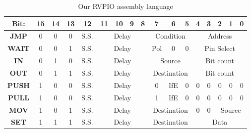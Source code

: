\begin{table}[h!]
    \begin{tabular}{|c|c|c|c|c|c|c|c|c|c|c|c|c|c|c|c|c|}
        \hline
        \textbf{Bit:} & 15 & 14 & 13 & 12   & 11                         & 10                               & 9                              & 8 & 7                               & 6 & 5 & 4 & 3 & 2 & 1 & 0 \\ \hline
        \textbf{JMP}  & 0  & 0  & 0  & S.S. & \multicolumn{4}{c|}{Delay} & \multicolumn{3}{c|}{Condition}   & \multicolumn{5}{c|}{Address}                                                                     \\ \hline
        \textbf{WAIT} & 0  & 0  & 1  & S.S. & \multicolumn{4}{c|}{Delay} & Pol                              & 0                              & 0 & \multicolumn{5}{c|}{Pin Select}                             \\ \hline
        \textbf{IN}   & 0  & 1  & 0  & S.S. & \multicolumn{4}{c|}{Delay} & \multicolumn{3}{c|}{Source}      & \multicolumn{5}{c|}{Bit count}                                                                   \\ \hline
        \textbf{OUT}  & 0  & 1  & 1  & S.S. & \multicolumn{4}{c|}{Delay} & \multicolumn{3}{c|}{Destination} & \multicolumn{5}{c|}{Bit count}                                                                   \\ \hline
        \textbf{PUSH} & 1  & 0  & 0  & S.S. & \multicolumn{4}{c|}{Delay} & 0                                & IfE                            & 0 & 0                               & 0 & 0 & 0 & 0             \\ \hline
        \textbf{PULL} & 1  & 0  & 0  & S.S. & \multicolumn{4}{c|}{Delay} & 1                                & IfE                            & 0 & 0                               & 0 & 0 & 0 & 0             \\ \hline
        \textbf{MOV}  & 1  & 0  & 1  & S.S. & \multicolumn{4}{c|}{Delay} & \multicolumn{3}{c|}{Destination} & 0                              & 0 & \multicolumn{3}{c|}{Source}                                 \\ \hline
        \textbf{SET}  & 1  & 1  & 1  & S.S. & \multicolumn{4}{c|}{Delay} & \multicolumn{3}{c|}{Destination} & \multicolumn{5}{c|}{Data}                                                                        \\ \hline
    \end{tabular}
    \caption{Our RVPIO assembly language \cite{rp2040}}
    \label{tab:rvpioasm}
\end{table}



